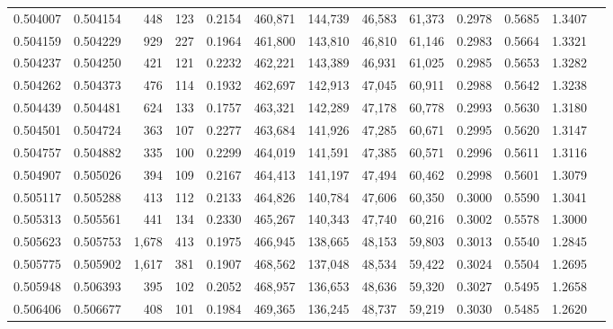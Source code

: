 \begin{tabular}{rrrrrrrrrrrrr}
0.504007 & 0.504154 &   448 &   123 &                                     0.2154 & 460,871 & 144,739 &  46,583 &  61,373 & 0.2978 & 0.5685 & 1.3407 \\
0.504159 & 0.504229 &   929 &   227 &                                     0.1964 & 461,800 & 143,810 &  46,810 &  61,146 & 0.2983 & 0.5664 & 1.3321 \\
0.504237 & 0.504250 &   421 &   121 &                                     0.2232 & 462,221 & 143,389 &  46,931 &  61,025 & 0.2985 & 0.5653 & 1.3282 \\
0.504262 & 0.504373 &   476 &   114 &                                     0.1932 & 462,697 & 142,913 &  47,045 &  60,911 & 0.2988 & 0.5642 & 1.3238 \\
0.504439 & 0.504481 &   624 &   133 &                                     0.1757 & 463,321 & 142,289 &  47,178 &  60,778 & 0.2993 & 0.5630 & 1.3180 \\
0.504501 & 0.504724 &   363 &   107 &                                     0.2277 & 463,684 & 141,926 &  47,285 &  60,671 & 0.2995 & 0.5620 & 1.3147 \\
0.504757 & 0.504882 &   335 &   100 &                                     0.2299 & 464,019 & 141,591 &  47,385 &  60,571 & 0.2996 & 0.5611 & 1.3116 \\
0.504907 & 0.505026 &   394 &   109 &                                     0.2167 & 464,413 & 141,197 &  47,494 &  60,462 & 0.2998 & 0.5601 & 1.3079 \\
0.505117 & 0.505288 &   413 &   112 &                                     0.2133 & 464,826 & 140,784 &  47,606 &  60,350 & 0.3000 & 0.5590 & 1.3041 \\
0.505313 & 0.505561 &   441 &   134 &                                     0.2330 & 465,267 & 140,343 &  47,740 &  60,216 & 0.3002 & 0.5578 & 1.3000 \\
0.505623 & 0.505753 & 1,678 &   413 &                                     0.1975 & 466,945 & 138,665 &  48,153 &  59,803 & 0.3013 & 0.5540 & 1.2845 \\
0.505775 & 0.505902 & 1,617 &   381 &                                     0.1907 & 468,562 & 137,048 &  48,534 &  59,422 & 0.3024 & 0.5504 & 1.2695 \\
0.505948 & 0.506393 &   395 &   102 &                                     0.2052 & 468,957 & 136,653 &  48,636 &  59,320 & 0.3027 & 0.5495 & 1.2658 \\
0.506406 & 0.506677 &   408 &   101 &                                     0.1984 & 469,365 & 136,245 &  48,737 &  59,219 & 0.3030 & 0.5485 & 1.2620 \\

\end{tabular}
